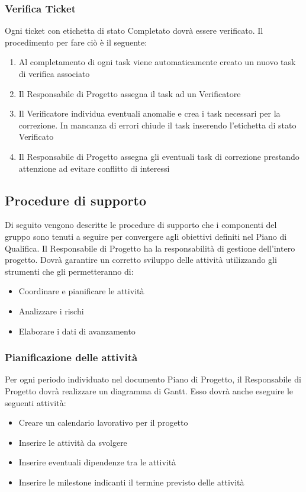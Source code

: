 \subsubsection{Verifica Ticket}

Ogni ticket con etichetta di stato Completato dovrà essere verificato. Il procedimento per fare ciò è il seguente:

\begin{enumerate}
	\item  Al completamento di ogni task viene automaticamente creato un nuovo task di verifica associato
	\item Il Responsabile di Progetto assegna il task ad un Verificatore
	\item Il Verificatore individua eventuali anomalie e crea i task necessari per la correzione. In mancanza di errori chiude il task inserendo l’etichetta di stato Verificato
	\item Il Responsabile di Progetto assegna gli eventuali task di correzione prestando attenzione ad evitare conflitto di interessi
\end{enumerate}

\subsection{Procedure di supporto}
Di seguito vengono descritte le procedure di supporto che i componenti del gruppo sono tenuti a seguire per convergere agli obiettivi definiti nel Piano di Qualifica. Il Responsabile di Progetto ha la responsabilità di gestione dell’intero progetto.
Dovrà garantire un corretto sviluppo delle attività utilizzando gli strumenti che gli permetteranno di:
\begin{itemize}
	\item Coordinare e pianificare le attività
	\item Analizzare i rischi
	\item Elaborare i dati di avanzamento
\end{itemize}

\subsubsection{Pianificazione delle attività}

Per ogni periodo individuato nel documento Piano di Progetto, il Responsabile di Progetto dovrà realizzare un diagramma di Gantt. Esso dovrà anche eseguire le seguenti attività:

\begin{itemize}
	\item Creare un calendario lavorativo per il progetto
	\item Inserire le attività da svolgere
	\item Inserire eventuali dipendenze tra le attività
	\item Inserire le milestone indicanti il termine previsto delle attività
\end{itemize}

